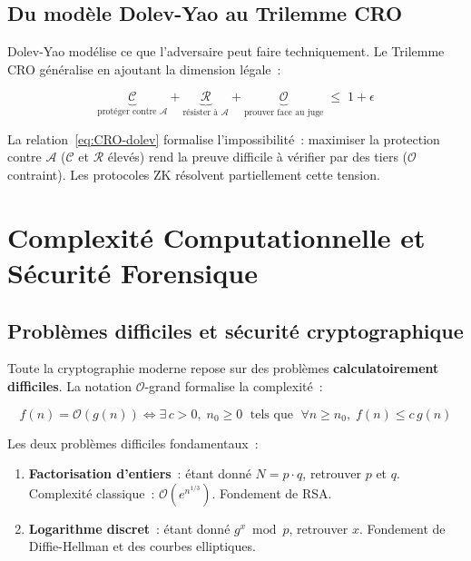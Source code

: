 \subsection{Du modèle Dolev-Yao au Trilemme CRO}

Dolev-Yao modélise ce que l'adversaire peut faire techniquement.
Le Trilemme CRO généralise en ajoutant la dimension légale~:

\begin{equation}
\underbrace{\mathcal{C}}_{\text{protéger contre }\mathcal{A}} +
\underbrace{\mathcal{R}}_{\text{résister à }\mathcal{A}} +
\underbrace{\mathcal{O}}_{\text{prouver face au juge}}
\;\leq\; 1 + \epsilon
\label{eq:CRO-dolev}
\end{equation}

La relation~\eqref{eq:CRO-dolev} formalise l'impossibilité~: maximiser la
protection contre $\mathcal{A}$ ($\mathcal{C}$ et $\mathcal{R}$ élevés) rend
la preuve difficile à vérifier par des tiers ($\mathcal{O}$ contraint).
Les protocoles ZK résolvent partiellement cette tension.

\section{Complexité Computationnelle et Sécurité Forensique}
\label{sec:complexite}

\subsection{Problèmes difficiles et sécurité cryptographique}

Toute la cryptographie moderne repose sur des problèmes
\textbf{calculatoirement difficiles}. La notation $\mathcal{O}$-grand
formalise la complexité~:

\begin{equation}
f(n) = \mathcal{O}(g(n)) \iff
\exists\, c > 0,\; n_0 \geq 0 \;\text{ tels que }\;
\forall n \geq n_0,\; f(n) \leq c\,g(n)
\label{eq:big-O}
\end{equation}

Les deux problèmes difficiles fondamentaux~:
\begin{enumerate}
    \item \textbf{Factorisation d'entiers}~: étant donné $N = p \cdot q$,
          retrouver $p$ et $q$. Complexité classique~:
          $\mathcal{O}(e^{n^{1/3}})$. Fondement de RSA.
    \item \textbf{Logarithme discret}~: étant donné $g^x \bmod p$,
          retrouver $x$. Fondement de Diffie-Hellman et des courbes
          elliptiques.
\end{enumerate}

